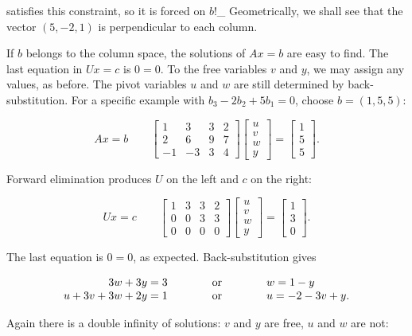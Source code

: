 satisfies this constraint, so it is forced on \(b!\)_ Geometrically, we shall see that the vector \((5,-2,1)\) is perpendicular to each column.

If \(b\) belongs to the column space, the solutions of \(Ax=b\) are easy to find. The last equation in \(Ux=c\) is \(0=0\). To the free variables \(v\) and \(y\), we may assign any values, as before. The pivot variables \(u\) and \(w\) are still determined by back-substitution. For a specific example with \(b_{3}-2b_{2}+5b_{1}=0\), choose \(b=(1,5,5)\):

\[Ax=b\qquad\begin{bmatrix}1&3&3&2\\ 2&6&9&7\\ -1&-3&3&4\end{bmatrix}\begin{bmatrix}u\\ v\\ w\\ y\end{bmatrix}=\begin{bmatrix}1\\ 5\\ 5\end{bmatrix}.\]

Forward elimination produces \(U\) on the left and \(c\) on the right:

\[Ux=c\qquad\begin{bmatrix}1&3&3&2\\ 0&0&3&3\\ 0&0&0&0\end{bmatrix}\begin{bmatrix}u\\ v\\ w\\ y\end{bmatrix}=\begin{bmatrix}1\\ 3\\ 0\end{bmatrix}.\]

The last equation is \(0=0\), as expected. Back-substitution gives

\[\begin{array}{r@{\qquad}l@{\qquad}l}3w+3y=3\qquad&\text{or}\qquad&w=1-y\\ u+3v+3w+2y=1\qquad&\text{or}\qquad&u=-2-3v+y.\end{array}\]

Again there is a double infinity of solutions: \(v\) and \(y\) are free, \(u\) and \(w\) are not:

